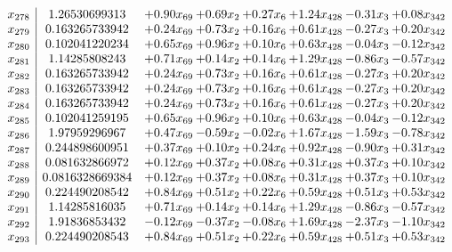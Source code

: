 \documentclass[8pt]{article}
\begin{document}
\[\begin{array}{c| c c@{\hskip 2pt} c@{\hskip 2pt} c@{\hskip 2pt} c@{\hskip 2pt} c@{\hskip 2pt} c@{\hskip 2pt} }
 x_{278}   &  1.26530699313 & +  0.90 x_{69} & +  0.69 x_{2} & +  0.27 x_{6} & +  1.24 x_{428} & -0.31 x_{3} & +  0.08 x_{342}\\
 x_{279}   &  0.163265733942 & +  0.24 x_{69} & +  0.73 x_{2} & +  0.16 x_{6} & +  0.61 x_{428} & -0.27 x_{3} & +  0.20 x_{342}\\
 x_{280}   &  0.102041220234 & +  0.65 x_{69} & +  0.96 x_{2} & +  0.10 x_{6} & +  0.63 x_{428} & -0.04 x_{3} & -0.12 x_{342}\\
 x_{281}   &  1.14285808243 & +  0.71 x_{69} & +  0.14 x_{2} & +  0.14 x_{6} & +  1.29 x_{428} & -0.86 x_{3} & -0.57 x_{342}\\
 x_{282}   &  0.163265733942 & +  0.24 x_{69} & +  0.73 x_{2} & +  0.16 x_{6} & +  0.61 x_{428} & -0.27 x_{3} & +  0.20 x_{342}\\
 x_{283}   &  0.163265733942 & +  0.24 x_{69} & +  0.73 x_{2} & +  0.16 x_{6} & +  0.61 x_{428} & -0.27 x_{3} & +  0.20 x_{342}\\
 x_{284}   &  0.163265733942 & +  0.24 x_{69} & +  0.73 x_{2} & +  0.16 x_{6} & +  0.61 x_{428} & -0.27 x_{3} & +  0.20 x_{342}\\
 x_{285}   &  0.102041259195 & +  0.65 x_{69} & +  0.96 x_{2} & +  0.10 x_{6} & +  0.63 x_{428} & -0.04 x_{3} & -0.12 x_{342}\\
 x_{286}   &  1.97959296967 & +  0.47 x_{69} & -0.59 x_{2} & -0.02 x_{6} & +  1.67 x_{428} & -1.59 x_{3} & -0.78 x_{342}\\
 x_{287}   &  0.244898600951 & +  0.37 x_{69} & +  0.10 x_{2} & +  0.24 x_{6} & +  0.92 x_{428} & -0.90 x_{3} & +  0.31 x_{342}\\
 x_{288}   &  0.081632866972 & +  0.12 x_{69} & +  0.37 x_{2} & +  0.08 x_{6} & +  0.31 x_{428} & +  0.37 x_{3} & +  0.10 x_{342}\\
 x_{289}   &  0.0816328669384 & +  0.12 x_{69} & +  0.37 x_{2} & +  0.08 x_{6} & +  0.31 x_{428} & +  0.37 x_{3} & +  0.10 x_{342}\\
 x_{290}   &  0.224490208542 & +  0.84 x_{69} & +  0.51 x_{2} & +  0.22 x_{6} & +  0.59 x_{428} & +  0.51 x_{3} & +  0.53 x_{342}\\
 x_{291}   &  1.14285816035 & +  0.71 x_{69} & +  0.14 x_{2} & +  0.14 x_{6} & +  1.29 x_{428} & -0.86 x_{3} & -0.57 x_{342}\\
 x_{292}   &  1.91836853432 & -0.12 x_{69} & -0.37 x_{2} & -0.08 x_{6} & +  1.69 x_{428} & -2.37 x_{3} & -1.10 x_{342}\\
 x_{293}   &  0.224490208543 & +  0.84 x_{69} & +  0.51 x_{2} & +  0.22 x_{6} & +  0.59 x_{428} & +  0.51 x_{3} & +  0.53 x_{342}\\

\end{array}\]
\end{document}
